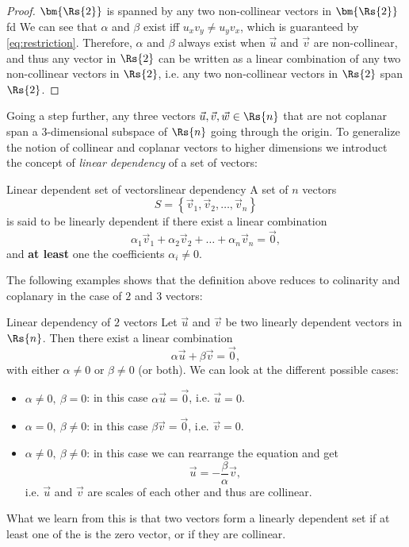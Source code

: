 \begin{proof}{$\bm{\Rs{2}}$ is spanned by any two non-collinear vectors in $\bm{\Rs{2}}$}{fd}
	We can see that $\alpha$ and $\beta$ exist iff $u_{x}v_{y}\neq u_{y}v_{x}$, which is guaranteed by \autoref{eq:restriction}. Therefore, $\alpha$ and $\beta$ always exist when $\vec{u}$ and $\vec{v}$ are non-collinear, and thus any vector in $\Rs{2}$ can be written as a linear combination of any two non-collinear vectors in $\Rs{2}$, i.e. any two non-collinear vectors in $\Rs{2}$ span $\Rs{2}$.
\end{proof}

Going a step further, any three vectors $\vec{u},\vec{v},\vec{w}\in\Rs{n}$ that are not coplanar span a 3-dimensional subspace of $\Rs{n}$ going through the origin. To generalize the notion of collinear and coplanar vectors to higher dimensions we introduct the concept of \emph{linear dependency} of a set of vectors:

\begin{definition}{Linear dependent set of vectors}{linear dependency}
	A set of $n$ vectors
	\begin{equation}
		S = \left\{ \vec{v}_{1}, \vec{v}_{2}, \dots, \vec{v}_{n} \right\}
		\label{eq:set of n vectors}
	\end{equation}
	is said to be linearly dependent if there exist a linear combination
	\begin{equation}
		\alpha_{1}\vec{v}_{1} + \alpha_{2}\vec{v}_{2} + \dots + \alpha_{n}\vec{v}_{n} = \vec{0},
		\label{eq:set of n vectors}
	\end{equation}
	and \textbf{at least} one the coefficients $\alpha_{i}\neq0$.
\end{definition}

The following examples shows that the definition above reduces to colinarity and coplanary in the case of $2$ and $3$ vectors:
\begin{example}{Linear dependency of $2$ vectors}{}
	Let $\vec{u}$ and $\vec{v}$ be two linearly dependent vectors in $\Rs{n}$. Then there exist a linear combination
	\[
		\alpha\vec{u} + \beta\vec{v} = \vec{0},
	\]
	with either $\alpha\neq0$ or $\beta\neq0$ (or both). We can look at the different possible cases:
	\begin{itemize}
		\item $\alpha\neq0,\ \beta=0$: in this case $\alpha\vec{u}=\vec{0}$, i.e. $\vec{u}=0$.
		\item $\alpha=0,\ \beta\neq0$: in this case $\beta\vec{v}=\vec{0}$, i.e. $\vec{v}=0$.
		\item $\alpha\neq0,\ \beta\neq0$: in this case we can rearrange the equation and get
			\[
				\vec{u} = -\frac{\beta}{\alpha}\vec{v},
			\]
			i.e. $\vec{u}$ and $\vec{v}$ are scales of each other and thus are collinear.
	\end{itemize}
	What we learn from this is that two vectors form a linearly dependent set if at least one of the is the zero vector, or if they are collinear.

\end{example}

